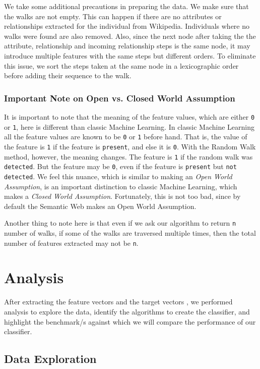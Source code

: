 \documentclass[runningheads,a4paper]{llncs}
\begin{document}
We take some additional precautions in preparing the data. We make sure that the walks are not empty. This can happen if there are no attributes or relationships extracted for the individual from Wikipedia. Individuals where no walks were found are also removed. Also, since the next node after taking the the attribute, relationship and incoming relationship steps is the same node, it may introduce multiple features with the same steps but different orders. To eliminate this issue, we sort the steps taken at the same node in a lexicographic order before adding their sequence to the walk.
 
\subsubsection{Important Note on Open vs. Closed World Assumption}
It is important to note that the meaning of the feature values, which are either \texttt{0} or \texttt{1}, here is different than classic Machine Learning. In classic Machine Learning all the feature values are known to be \texttt{0} or \texttt{1} before hand. That is, the value of the feature is \texttt{1} if the feature is \texttt{present}, and else it is \texttt{0}. With the Random Walk method, however, the meaning changes. The feature is \texttt{1} if the random walk was \texttt{detected}. But the feature may be \texttt{0}, even if the feature is \texttt{present} but \texttt{not detected}. We feel this nuance, which is similar to making an \textit{Open World Assumption}, is an important distinction to classic Machine Learning, which makes a \textit{Closed World Assumption}. Fortunately, this is not too bad, since by default the Semantic Web makes an Open World Assumption. 

Another thing to note here is that even if we ask our algorithm to return \texttt{n} number of walks, if some of the walks are traversed multiple times, then the total number of features extracted may not be \texttt{n}.

\section{Analysis}
After extracting the feature vectors and the target vectors , we performed analysis to explore the data, identify the algorithms to create the classifier, and highlight the benchmark/s against which we will compare the performance of our classifier.

\subsection{Data Exploration}
\end{document}
